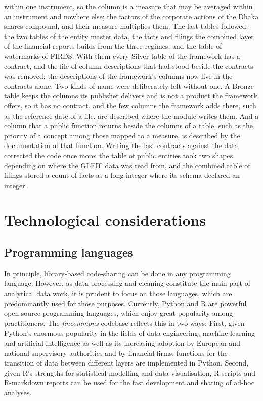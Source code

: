 \documentclass[a4paper, 11pt]{report}
\begin{document}
within one instrument, so the column is a measure that may be averaged within an instrument and nowhere else; the factors of the corporate actions of the Dhaka shares compound, and their measure multiplies them. The last tables followed: the two tables of the entity master data, the facts and filings the combined layer of the financial reports builds from the three regimes, and the table of watermarks of FIRDS. With them every Silver table of the framework has a contract, and the file of column descriptions that had stood beside the contracts was removed; the descriptions of the framework's columns now live in the contracts alone. Two kinds of name were deliberately left without one. A Bronze table keeps the columns its publisher delivers and is not a product the framework offers, so it has no contract, and the few columns the framework adds there, such as the reference date of a file, are described where the module writes them. And a column that a public function returns beside the columns of a table, such as the priority of a concept among those mapped to a measure, is described by the documentation of that function. Writing the last contracts against the data corrected the code once more: the table of public entities took two shapes depending on where the GLEIF data was read from, and the combined table of filings stored a count of facts as a long integer where its schema declared an integer.


\section{Technological considerations}


\subsection{Programming languages}

In principle, library-based code-sharing can be done in any programming language. However, as data processing and cleaning constitute the main part of analytical data work, it is prudent to focus on those languages, which are predominantly used for those purposes. Currently, Python and R are powerful open-source programming languages, which enjoy great popularity among practitioners. The \emph{fincommons} codebase reflects this in two ways: First, given Python's enormous popularity in the fields of data engineering, machine learning and artificial intelligence as well as its increasing adoption by European and national supervisory authorities and by financial firms, functions for the transition of data between different layers are implemented in Python. Second, given R's strengths for statistical modelling and data visualisation, R-scripts and R-markdown reports can be used for the fast development and sharing of ad-hoc analyses.
\end{document}

